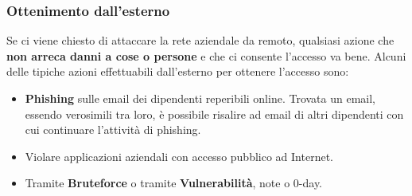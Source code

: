 \documentclass{article}
\begin{document}
\subsubsection{Ottenimento dall'esterno}
Se ci viene chiesto di attaccare la rete aziendale da remoto, qualsiasi azione che \textbf{non arreca danni a cose o persone} e che ci consente l'accesso va bene. Alcuni delle tipiche azioni effettuabili dall'esterno per ottenere l'accesso sono:
\begin{itemize}
	\item \textbf{Phishing} sulle email dei dipendenti reperibili online.
	Trovata un email, essendo verosimili tra loro, è possibile risalire ad email di altri dipendenti con cui continuare l'attività di phishing.
	
	\item Violare applicazioni aziendali con accesso pubblico ad Internet.
	
	\item Tramite \textbf{Bruteforce} o tramite \textbf{Vulnerabilità}, note o 0-day.
\end{itemize}
\end{document}
